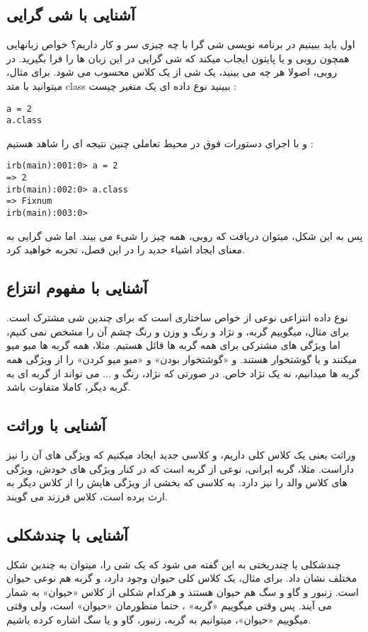 \documentclass[11pt]{article}
\begin{document}
\subsection{آشنایی با شی گرایی}
اول باید ببینیم در برنامه نویسی شی گرا با چه چیزی سر و کار داریم؟ خواص زبانهایی همچون روبی و یا پایتون ایجاب میکند که شی گرایی در این زبان ها را فرا بگیرید. در روبی، اصولا هر چه می بینید، یک شی از یک کلاس محسوب می شود. برای مثال، میتوانید با متد class ببینید نوع داده ای یک متغیر چیست :
\begin{latin}
\begin{verbatim}
a = 2
a.class
\end{verbatim}
\end{latin}
و با اجرای دستورات فوق در محیط تعاملی چنین نتیجه ای را شاهد هستیم :
\begin{latin}
\begin{verbatim}
irb(main):001:0> a = 2
=> 2
irb(main):002:0> a.class
=> Fixnum
irb(main):003:0>
\end{verbatim}
\end{latin}
پس به این شکل، میتوان دریافت که روبی، همه چیز را شیء می بیند. اما شی گرایی به معنای ایجاد اشیاء جدید را در این فصل، تجربه خواهید کرد. 
\subsection{آشنایی با مفهوم انتزاع}
نوع داده انتزاعی
نوعی از خواص ساختاری است که برای چندین شی مشترک است. برای مثال، میگوییم گربه، و نژاد و رنگ و وزن و رنگ چشم آن را مشخص نمی کنیم، اما ویژگی های مشترکی برای همه گربه ها قائل هستیم. مثلا، همه گربه ها میو میو میکنند و یا گوشتخوار هستند. و «گوشتخوار بودن» و «میو میو کردن» را از ویژگی همه گربه ها میدانیم، نه یک نژاد خاص. در صورتی که نژاد، رنگ و ... می تواند از گربه ای به گربه دیگر، کاملا متفاوت باشد. 
\subsection{آشنایی با وراثت}
وراثت
یعنی یک کلاس کلی داریم، و کلاسی جدید ایجاد میکنیم که ویژگی های آن را نیز داراست. مثلا، گربه ایرانی، نوعی از گربه است که در کنار ویژگی های خودش، ویژگی های کلاس والد
را نیز دارد. به کلاسی که بخشی از ویژگی هایش را از کلاس دیگر به ارث برده است، کلاس فرزند
می گویند.
\subsection{آشنایی با چندشکلی}
چندشکلی یا چندریختی
به این گفته می شود که یک شی را، میتوان به چندین شکل مختلف نشان داد. برای مثال، یک کلاس کلی حیوان وجود دارد، و گربه هم نوعی حیوان است. زنبور و گاو و سگ هم حیوان هستند و هرکدام شکلی از کلاس «حیوان» به شمار می آیند. پس وقتی میگوییم «گربه» ، حتما منظورمان «حیوان» است، ولی وقتی میگوییم «حیوان»، میتوانیم به گربه، زنبور، گاو و یا سگ اشاره کرده باشیم. 
\end{document}

